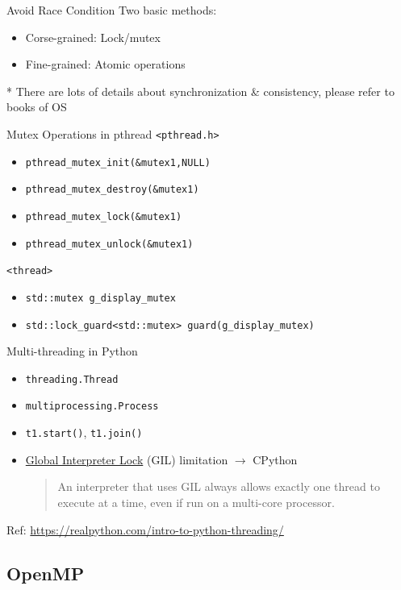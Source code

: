 \documentclass{../TexTemplate/myslide}
\begin{document}
\begin{frame}{Avoid Race Condition}
Two basic methods:
\begin{itemize}
	\item Corse-grained: Lock/mutex
	\item Fine-grained: Atomic operations
\end{itemize}
* There are lots of details about synchronization \& consistency, please refer to books of OS
\end{frame}

\begin{frame}[fragile]{Mutex Operations in pthread}
\verb'<pthread.h>'
\begin{itemize}
\item \verb'pthread_mutex_init(&mutex1,NULL)'
\item \verb'pthread_mutex_destroy(&mutex1)'
\item \verb'pthread_mutex_lock(&mutex1)'
\item \verb'pthread_mutex_unlock(&mutex1)'
\end{itemize}
\verb'<thread>'
\begin{itemize}
	\item \verb'std::mutex g_display_mutex'
	\item \verb'std::lock_guard<std::mutex> guard(g_display_mutex)'
\end{itemize}
\end{frame}

\begin{frame}[fragile]{Multi-threading in Python}
\begin{itemize}
	\item \verb'threading.Thread'
	\item \verb'multiprocessing.Process'
	\item \verb't1.start()', \verb't1.join()'
	\item \href{https://en.wikipedia.org/wiki/Global_interpreter_lock}{Global Interpreter Lock} (GIL) limitation $\to$ CPython
	\begin{quote}
	An interpreter that uses GIL always allows exactly one thread to execute at a time, even if run on a multi-core processor.
	\end{quote}
\end{itemize}
Ref: \url{https://realpython.com/intro-to-python-threading/}
\end{frame}

\subsection{OpenMP}
\begin{frame}
\subsectionpage
\end{frame}
\end{document}
